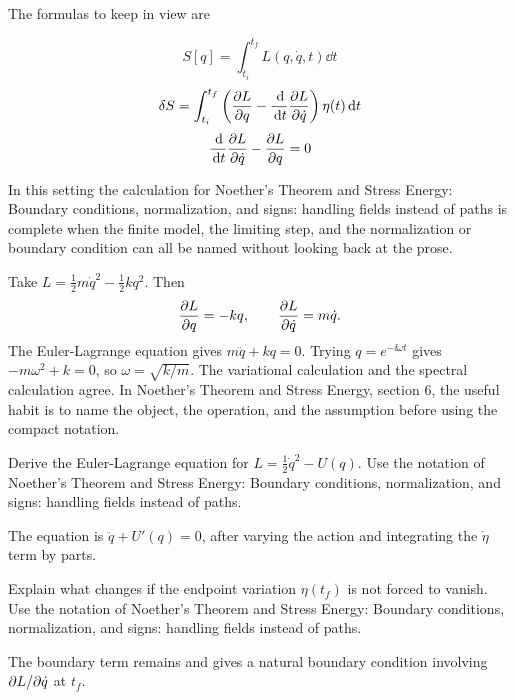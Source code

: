 The formulas to keep in view are

\[
  S[q]=\int_{t_i}^{t_f}L(q,\dot q,t)\dd t
\]
\[
  \delta S=\int_{t_i}^{t_f}\left(\frac{\partial L}{\partial q}-\frac{\,\mathrm d}{\,\mathrm d t}\frac{\partial L}{\partial\dot q}\right)\eta(t)\,\mathrm d t
\]
\[
  \frac{\,\mathrm d}{\,\mathrm d t}\frac{\partial L}{\partial\dot q}-\frac{\partial L}{\partial q}=0
\]

In this setting the calculation for Noether's Theorem and Stress Energy: Boundary conditions, normalization, and signs: handling fields instead of paths is complete when the finite model, the limiting step, and the normalization or boundary condition can all be named without looking back at the prose.




\begin{example}
Take \(L=\frac12m\dot q^2-\frac12kq^2\).  Then
\[
  \frac{\partial L}{\partial q}=-kq,\qquad \frac{\partial L}{\partial\dot q}=m\dot q.
\]
The Euler-Lagrange equation gives \(m\ddot q+kq=0\).  Trying \(q=e^{-\ii\omega t}\) gives \(-m\omega^2+k=0\), so \(\omega=\sqrt{k/m}\).  The variational calculation and the spectral calculation agree.  In Noether's Theorem and Stress Energy, section 6, the useful habit is to name the object, the operation, and the assumption before using the compact notation.
\end{example}



\begin{exercise}
Derive the Euler-Lagrange equation for \(L=\frac12\dot q^2-U(q)\).  Use the notation of Noether's Theorem and Stress Energy: Boundary conditions, normalization, and signs: handling fields instead of paths.
\begin{answer}
The equation is \(\ddot q+U'(q)=0\), after varying the action and integrating the \(\dot\eta\) term by parts.
\end{answer}
\end{exercise}

\begin{exercise}
Explain what changes if the endpoint variation \(\eta(t_f)\) is not forced to vanish.  Use the notation of Noether's Theorem and Stress Energy: Boundary conditions, normalization, and signs: handling fields instead of paths.
\begin{answer}
The boundary term remains and gives a natural boundary condition involving \(\partial L/\partial\dot q\) at \(t_f\).
\end{answer}
\end{exercise}



